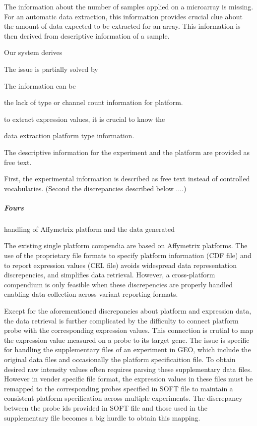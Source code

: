 The information about the number of samples applied on a microarray is 
missing. 
%
For an automatic data extraction, this information provides crucial clue 
about the amount of data expected to be extracted for an array. 
%
This information is then derived from descriptive information of a sample. 

Our system derives 

The issue is partially solved by 

The information can be 


the lack of type or channel count information for platform.

to extract expression values, it is crucial to know the

data extraction platform type information.

The descriptive information for the experiment and the platform are
provided as free text.

First, the experimental information is described as free text instead of
controlled vocabularies.
%
(Second the discrepancies described below ....)
%



\subparagraph{Fours} handling of Affymetrix platform and the data generated

The existing single platform compendia are based on Affymetrix
platforms. The use of the proprietary file formats to specify platform
information (CDF file) and to report expression values (CEL file) avoids
widespread data representation discrepencies, and simplifies data
retrieval.
%
However, a cross-platform compendium is only feasible when these
discrepencies are properly handled enabling data collection across
variant reporting formats.









Except for the aforementioned discrepancies about platform and expression data,
the data retrieval is further complicated by the difficulty to connect platform
probe with the corresponding expression values.
%
This connection is crutial to map the expression value measured on a probe to
its target gene.
%
The issue is specific for handling the supplementary files of an experiment in
GEO, which include the original data files and occasionally the platform
specificaition file.
%
To obtain desired raw intensity values often requires parsing these
supplementary data files.
%
However in vender specific file format, the expression values in these files
must be remapped to the corresponding probes specified in SOFT file to maintain
a consistent platform specification across multiple experiments. 
%
The discrepancy between the probe ids provided in SOFT file and those used in
the supplementary file becomes a big hurdle to obtain this mapping. 
%



